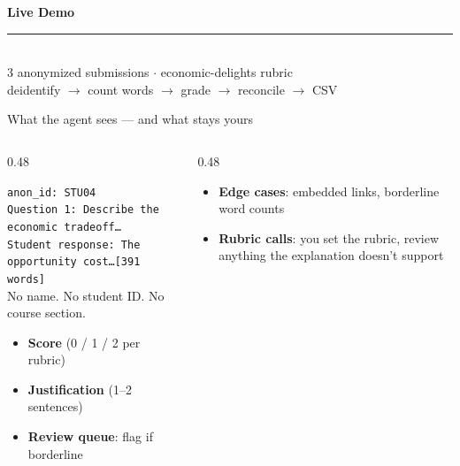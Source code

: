\documentclass[aspectratio=169, 10pt]{beamer}
\begin{document}
{
\begin{frame}[plain]
\centering\vfill
{\fontsize{20}{26}\bfseries\selectfont\color{white} \faTerminal\quad Live Demo}\\[10pt]
{\color{UVMGold}\rule{6cm}{0.8pt}}\\[10pt]
{\normalsize\color{PaleSage} 3 anonymized submissions \;$\cdot$\; economic-delights rubric}\\[4pt]
{\small\color{CoolGray} deidentify $\rightarrow$ count words $\rightarrow$ grade $\rightarrow$ reconcile $\rightarrow$ CSV}
\vfill
\end{frame}
}

\begin{frame}{What the agent sees --- and what stays yours}
\vskip2pt
\begin{columns}[T]
\begin{column}{0.48\textwidth}
\begin{tcolorbox}[pipelinebox, title={\faEye\quad The agent receives}]
\scriptsize
\texttt{anon\_id: STU04}\\
\texttt{Question 1: Describe the economic tradeoff\ldots}\\
\texttt{Student response: The opportunity cost\ldots [391 words]}\\[3pt]
No name. No student ID. No course section.
\end{tcolorbox}
\vskip3pt
\begin{tcolorbox}[pipelinebox, title={\faBrain\quad The agent returns}]
\scriptsize
\begin{itemize}\setlength{\itemsep}{1pt}
  \item \textbf{Score} (0 / 1 / 2 per rubric)
  \item \textbf{Justification} (1--2 sentences)
  \item \textbf{Review queue}: flag if borderline
\end{itemize}
\end{tcolorbox}
\end{column}
\begin{column}{0.48\textwidth}
\begin{tcolorbox}[keybox, title={\faUserCheck\quad Your judgment}]
\scriptsize
\begin{itemize}\setlength{\itemsep}{2pt}
  \item \textbf{Edge cases}: embedded links, borderline word counts
  \item \textbf{Rubric calls}: you set the rubric, review anything the explanation doesn't support

\end{itemize}
\end{tcolorbox}
\end{column}
\end{columns}
\end{frame}
\end{document}

